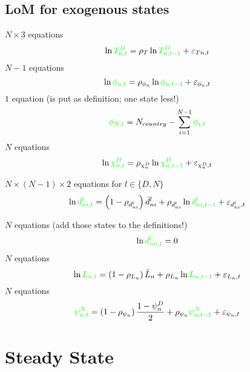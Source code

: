 \documentclass[12pt, bibtotoc, tablecaptionabove, figurecaptionabove, fleqn]{article}
\newcommand{\st}[1]{{\color{green}{#1}}}
\begin{document}
{\subsection{LoM for exogenous states}

\noindent $N \times 3$ equations
\begin{equation}
\ln \st{T^D_{n,t}} = \rho_T \ln  \st{T^D_{n,t-1}} + \varepsilon_{Tn,t}    
\end{equation}
\noindent $N-1$ equations
\begin{equation}
\ln \st{\phi_{n,t}} = \rho_{\phi_n} \ln  \st{\phi_{n,t-1}} + \varepsilon_{\phi_n,t}  
\end{equation}
\noindent $1$ equation (is put as definition; one state less!)
\begin{equation}
\st{\phi_{N,t}} = N_{country} - \sum_{i=1}^{N-1} \st{\phi_{i,t}}
\end{equation}
\noindent $N$ equations
\begin{equation}
\ln \st{\chi^D_{n,t}} = \rho_{\chi^D_n} \ln  \st{\chi^D_{n,t-1}} + \varepsilon_{\chi^D_n,t}    
\end{equation}

\noindent $N \times (N-1) \times 2$ equations for $l \in \{D,N\}$
\begin{equation}
\ln \st{d^l_{ni,t}} = \left(1 - \rho_{d^l_{ni}} \right) \bar{d}^l_{ni} + \rho_{d^l_{ni}} \ln  \st{d^l_{ni,t-1}} + \varepsilon_{d^l_{ni},t}    
\end{equation}

\noindent $N$ equations (add those states to the definitions!)
\begin{equation}
\ln \st{d^l_{nn,t}} = 0  
\end{equation}
\noindent $N$ equations
\begin{equation}
\ln \st{L_{n,t}} = \left(1 - \rho_{L_{n}} \right) \bar{L}_{n} + \rho_{L_{n}} \ln  \st{L_{n,t-1}} + \varepsilon_{L_{n},t}    
\end{equation}
\noindent $N$ equations
\begin{equation}
	\st{\psi_{n,t}^N} =  \left(1 - \rho_{\psi_{n}} \right) \frac{1 - \psi^D_{n}}{2} + \rho_{\psi_{n}} \st{\psi_{n,t-1}^N} + \varepsilon_{\psi_{n},t}   
\end{equation}


\section{Steady State}

}
\end{document}
